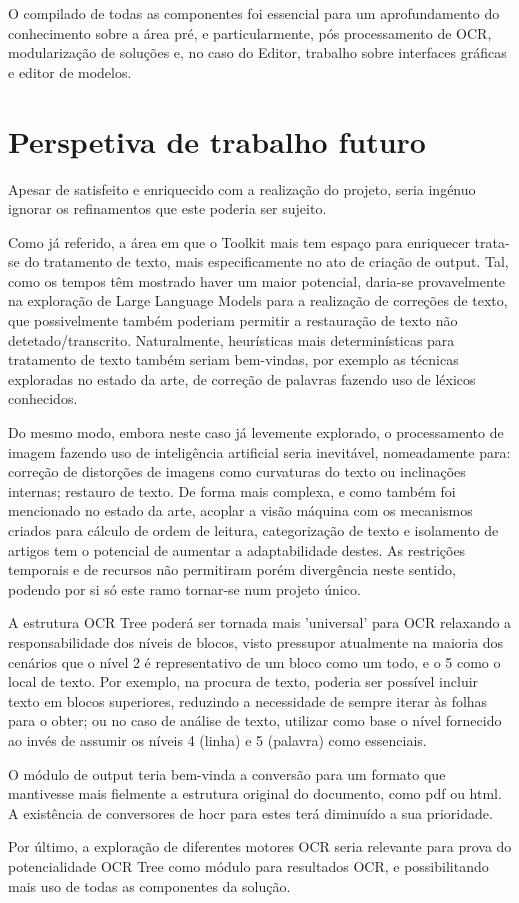 O compilado de todas as componentes foi essencial para um aprofundamento do conhecimento sobre a área pré, e particularmente, pós processamento de OCR, modularização de soluções e, no caso do Editor, trabalho sobre interfaces gráficas e editor de modelos.

\section{Perspetiva de trabalho futuro}

Apesar de satisfeito e enriquecido com a realização do projeto, seria ingénuo ignorar os refinamentos que este poderia ser sujeito. 

Como já referido, a área em que o Toolkit mais tem espaço para enriquecer trata-se do tratamento de texto, mais especificamente no ato de criação de output. Tal, como os tempos têm mostrado haver um maior potencial, daria-se provavelmente na exploração de Large Language Models para a realização de correções de texto, que possivelmente também poderiam permitir a restauração de texto não detetado/transcrito. Naturalmente, heurísticas mais determinísticas para tratamento de texto também seriam bem-vindas, por exemplo as técnicas exploradas no estado da arte, de correção de palavras fazendo uso de léxicos conhecidos.

Do mesmo modo, embora neste caso já levemente explorado, o processamento de imagem fazendo uso de inteligência artificial seria inevitável, nomeadamente para: correção de distorções de imagens como curvaturas do texto ou inclinações internas; restauro de texto. De forma mais complexa, e como também foi mencionado no estado da arte, acoplar a visão máquina com os mecanismos criados para cálculo de ordem de leitura, categorização de texto e isolamento de artigos tem o potencial de aumentar a adaptabilidade destes. As restrições temporais e de recursos não permitiram porém divergência neste sentido, podendo por si só este ramo tornar-se num projeto único.

A estrutura OCR Tree poderá ser tornada mais 'universal' para OCR relaxando a responsabilidade dos níveis de blocos, visto pressupor atualmente na maioria dos cenários que o nível 2 é representativo de um bloco como um todo, e o 5 como o local de texto. Por exemplo, na procura de texto, poderia ser possível incluir texto em blocos superiores, reduzindo a necessidade de sempre iterar às folhas para o obter; ou no caso de análise de texto, utilizar como base o nível fornecido ao invés de assumir os níveis 4 (linha) e 5 (palavra) como essenciais.

O módulo de output teria bem-vinda a conversão para um formato que mantivesse mais fielmente a estrutura original do documento, como pdf ou html. A existência de conversores de hocr para estes terá diminuído a sua prioridade.


Por último, a exploração de diferentes motores OCR seria relevante para prova do potencialidade OCR Tree como módulo para resultados OCR, e possibilitando mais uso de todas as componentes da solução.


		